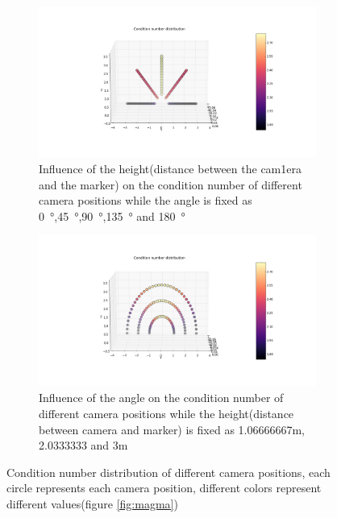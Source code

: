 \begin{figure}[H]
  \centering
  \begin{subfigure}[b]{1.0\textwidth}
    \includegraphics[width=\textwidth]{./fig/cond_dis_imageNor_height.png}
    \caption{Influence of the height(distance between the cam1era and the marker) on the condition number of different camera positions while the angle is fixed as \SI{0}{\degree},\SI{45}{\degree},\SI{90}{\degree},\SI{135}{\degree} and \SI{180}{\degree}}
  \end{subfigure}
  \begin{subfigure}[b]{1.0\textwidth}
    \includegraphics[width=\textwidth]{./fig/cond_dis_imageNor_angle.png}
    \caption{Influence of the angle on the condition number of different camera positions while the height(distance between camera and marker) is fixed as 1.06666667m, 2.0333333 and 3m}
  \end{subfigure}
  \caption{Condition number distribution of different camera positions, each circle represents each camera position, different colors represent different values(figure \ref{fig:magma})}
  \label{fig:cond_dis_imageNor_angle_height}
\end{figure}


